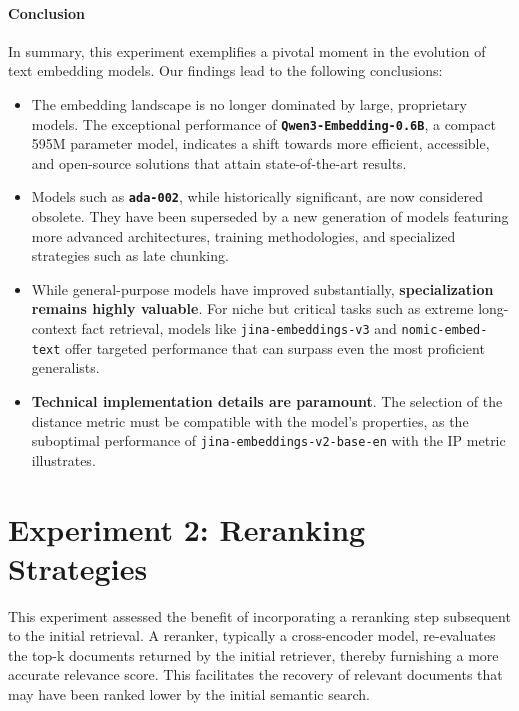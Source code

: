 \paragraph{Conclusion}
In summary, this experiment exemplifies a pivotal moment in the evolution of text embedding models. Our findings lead to the following conclusions:
\begin{itemize}
    \item The embedding landscape is no longer dominated by large, proprietary models. The exceptional performance of \textbf{\texttt{Qwen3-Embedding-0.6B}}, a compact 595M parameter model, indicates a shift towards more efficient, accessible, and open-source solutions that attain state-of-the-art results.
    \item Models such as \textbf{\texttt{ada-002}}, while historically significant, are now considered obsolete. They have been superseded by a new generation of models featuring more advanced architectures, training methodologies, and specialized strategies such as late chunking.
    \item While general-purpose models have improved substantially, \textbf{specialization remains highly valuable}. For niche but critical tasks such as extreme long-context fact retrieval, models like \texttt{jina-embeddings-v3} and \texttt{nomic-embed-text} offer targeted performance that can surpass even the most proficient generalists.
    \item \textbf{Technical implementation details are paramount}. The selection of the distance metric must be compatible with the model's properties, as the suboptimal performance of \texttt{jina-embeddings-v2-base-en} with the IP metric illustrates.
\end{itemize}



\section{Experiment 2: Reranking Strategies}
\label{sec:exp_reranking}
This experiment assessed the benefit of incorporating a reranking step subsequent to the initial retrieval. A reranker, typically a cross-encoder model, re-evaluates the top-k documents returned by the initial retriever, thereby furnishing a more accurate relevance score. This facilitates the recovery of relevant documents that may have been ranked lower by the initial semantic search.

